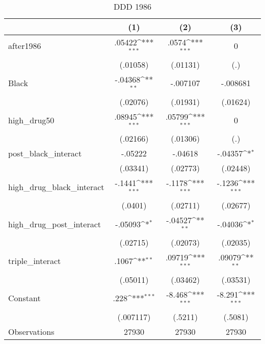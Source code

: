 \begin{table}[htbp]\centering
\def\sym#1{\ifmmode^{#1}\else\(^{#1}\)\fi}
\caption{DDD 1986}
\begin{tabular}{l*{3}{c}}
\hline\hline
                    &\multicolumn{1}{c}{(1)}         &\multicolumn{1}{c}{(2)}         &\multicolumn{1}{c}{(3)}         \\
\hline
after1986           &      .05422\sym{***}&       .0574\sym{***}&           0         \\
                    &    (.01058)         &    (.01131)         &         (.)         \\
[1em]
Black               &     -.04368\sym{**} &    -.007107         &    -.008681         \\
                    &    (.02076)         &    (.01931)         &    (.01624)         \\
[1em]
high\_drug50         &      .08945\sym{***}&      .05799\sym{***}&           0         \\
                    &    (.02166)         &    (.01306)         &         (.)         \\
[1em]
post\_black\_interact &     -.05222         &     -.04618         &     -.04357\sym{*}  \\
                    &    (.03341)         &    (.02773)         &    (.02448)         \\
[1em]
high\_drug\_black\_interact&      -.1441\sym{***}&      -.1178\sym{***}&      -.1236\sym{***}\\
                    &     (.0401)         &    (.02711)         &    (.02677)         \\
[1em]
high\_drug\_post\_interact&     -.05093\sym{*}  &     -.04527\sym{**} &     -.04036\sym{*}  \\
                    &    (.02715)         &    (.02073)         &    (.02035)         \\
[1em]
triple\_interact     &       .1067\sym{**} &      .09719\sym{***}&      .09079\sym{**} \\
                    &    (.05011)         &    (.03462)         &    (.03531)         \\
[1em]
Constant            &        .228\sym{***}&      -8.468\sym{***}&      -8.291\sym{***}\\
                    &   (.007117)         &     (.5211)         &     (.5081)         \\
\hline
Observations        &       27930         &       27930         &       27930         \\

\end{tabular}
\end{table}

